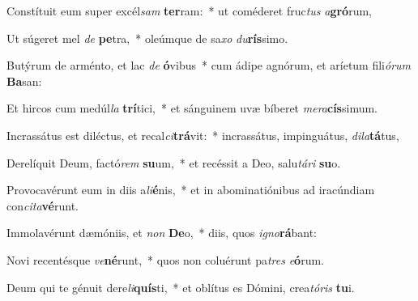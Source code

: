 \item Constítuit eum super excél\textit{sam} \textbf{ter}ram:~* ut coméderet fruc\textit{tus} \textit{a}\textbf{gró}rum,
\item Ut súgeret mel \textit{de} \textbf{pe}tra,~* oleúmque de sa\textit{xo} \textit{du}\textbf{rís}simo.
\item Butýrum de arménto, et lac \textit{de} \textbf{ó}vibus~* cum ádipe agnórum, et aríetum fili\textit{ó}\textit{rum} \textbf{Ba}san:
\item Et hircos cum medúl\textit{la} \textbf{trí}tici,~* et sánguinem uvæ bíberet \textit{me}\textit{ra}\textbf{cís}simum.
\item Incrassátus est diléctus, et recal\textit{ci}\textbf{trá}vit:~* incrassátus, impinguátus, \textit{di}\textit{la}\textbf{tá}tus,
\item Derelíquit Deum, factó\textit{rem} \textbf{su}um,~* et recéssit a Deo, salu\textit{tá}\textit{ri} \textbf{su}o.
\item Provocavérunt eum in diis a\textit{li}\textbf{é}nis,~* et in abominatiónibus ad iracúndiam con\textit{ci}\textit{ta}\textbf{vé}runt.
\item Immolavérunt dæmóniis, et \textit{non} \textbf{De}o,~* diis, quos \textit{i}\textit{gno}\textbf{rá}bant:
\item Novi recentésque \textit{ve}\textbf{né}runt,~* quos non coluérunt pa\textit{tres} \textit{e}\textbf{ó}rum.
\item Deum qui te génuit dere\textit{li}\textbf{quís}ti,~* et oblítus es Dómini, crea\textit{tó}\textit{ris} \textbf{tu}i.
